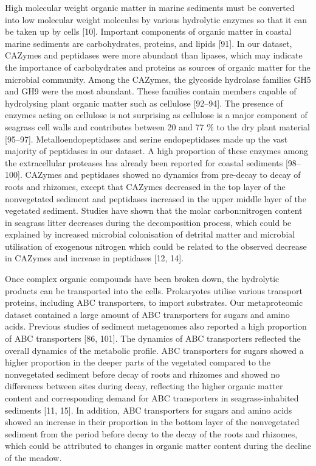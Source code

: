 \documentclass[
  12 pt,
]{article}
\begin{document}
High molecular weight organic matter in marine sediments must be converted into low molecular weight molecules by various hydrolytic enzymes so that it can be taken up by cells {[}10{]}. Important components of organic matter in coastal marine sediments are carbohydrates, proteins, and lipids {[}91{]}. In our dataset, CAZymes and peptidases were more abundant than lipases, which may indicate the importance of carbohydrates and proteins as sources of organic matter for the microbial community. Among the CAZymes, the glycoside hydrolase families GH5 and GH9 were the most abundant. These families contain members capable of hydrolysing plant organic matter such as cellulose {[}92--94{]}. The presence of enzymes acting on cellulose is not surprising as cellulose is a major component of seagrass cell walls and contributes between 20 and 77 \si{\percent} to the dry plant material {[}95--97{]}. Metalloendopeptidases and serine endopeptidases made up the vast majority of peptidases in our dataset. A high proportion of these enzymes among the extracellular proteases has already been reported for coastal sediments {[}98--100{]}. CAZymes and peptidases showed no dynamics from pre-decay to decay of roots and rhizomes, except that CAZymes decreased in the top layer of the nonvegetated sediment and peptidases increased in the upper middle layer of the vegetated sediment. Studies have shown that the molar carbon:nitrogen content in seagrass litter decreases during the decomposition process, which could be explained by increased microbial colonisation of detrital matter and microbial utilisation of exogenous nitrogen which could be related to the observed decrease in CAZymes and increase in peptidases {[}12, 14{]}.

Once complex organic compounds have been broken down, the hydrolytic products can be transported into the cells. Prokaryotes utilise various transport proteins, including ABC transporters, to import substrates. Our metaproteomic dataset contained a large amount of ABC transporters for sugars and amino acids. Previous studies of sediment metagenomes also reported a high proportion of ABC transporters {[}86, 101{]}. The dynamics of ABC transporters reflected the overall dynamics of the metabolic profile. ABC transporters for sugars showed a higher proportion in the deeper parts of the vegetated compared to the nonvegetated sediment before decay of roots and rhizomes and showed no differences between sites during decay, reflecting the higher organic matter content and corresponding demand for ABC transporters in seagrass-inhabited sediments {[}11, 15{]}. In addition, ABC transporters for sugars and amino acids showed an increase in their proportion in the bottom layer of the nonvegetated sediment from the period before decay to the decay of the roots and rhizomes, which could be attributed to changes in organic matter content during the decline of the meadow.
\end{document}
